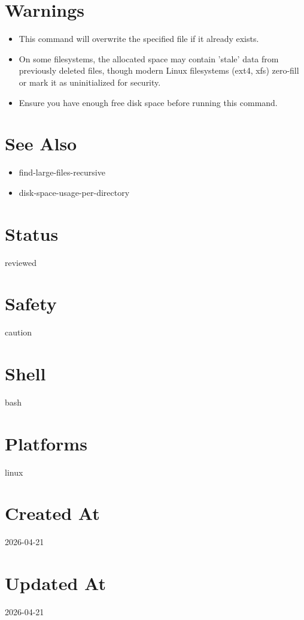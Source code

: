 \documentclass[openany]{book}
\begin{document}
\section*{Warnings}
\begin{itemize}
  \item This command will overwrite the specified file if it already exists.
  \item On some filesystems, the allocated space may contain 'stale' data from previously deleted files, though modern Linux filesystems (ext4, xfs) zero-fill or mark it as uninitialized for security.
  \item Ensure you have enough free disk space before running this command.
\end{itemize}

\section*{See Also}
\begin{itemize}
  \item find-large-files-recursive
  \item disk-space-usage-per-directory
\end{itemize}

\section*{Status}
reviewed

\section*{Safety}
caution

\section*{Shell}
bash

\section*{Platforms}
linux

\section*{Created At}
2026-04-21

\section*{Updated At}
2026-04-21
\end{document}
